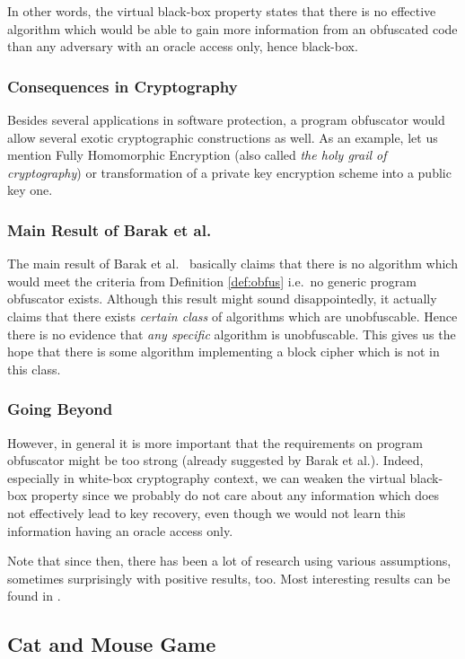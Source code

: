 	In other words, the virtual black-box property states that there is no effective algorithm which would be able to gain more information from an obfuscated code than any adversary with an oracle access only, hence black-box.

\subsubsection{Consequences in Cryptography}
	
	Besides several applications in software protection, a program obfuscator would allow several exotic cryptographic constructions as well. As an example, let us mention Fully Homomorphic Encryption (also called {\em the holy grail of cryptography}) or transformation of a private key encryption scheme into a public key one.

\subsubsection{Main Result of Barak et al.}
	
	The main result of Barak et al.\ \cite{barak2001possibility} basically claims that there is no algorithm which would meet the criteria from Definition \ref{def:obfus} i.e.\ no generic program obfuscator exists. Although this result might sound disappointedly, it actually claims that there exists {\em certain class} of algorithms which are unobfuscable. Hence there is no evidence that {\em any specific} algorithm is unobfuscable. This gives us the hope that there is some algorithm implementing a block cipher which is not in this class.

\subsubsection{Going Beyond}
	
	However, in general it is more important that the requirements on program obfuscator might be too strong (already suggested by Barak et al.). Indeed, especially in white-box cryptography context, we can weaken the virtual black-box property since we probably do not care about any information which does not effectively lead to key recovery, even though we would not learn this information having an oracle access only.
	
	Note that since then, there has been a lot of research using various assumptions, sometimes surprisingly with positive results, too. Most interesting results can be found in \cite{barak2014protecting, brakerski2014virtual}.



\subsection{Cat and Mouse Game}
\label{sec:catmouse}

